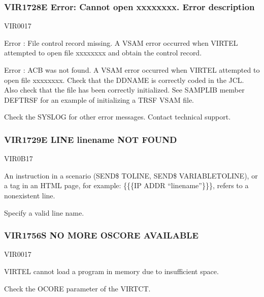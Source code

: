 \documentclass[letterpaper,10pt,english]{sphinxmanual}
\begin{document}
\subsubsection{VIR1728E Error: Cannot open xxxxxxxx. Error description}
\label{\detokenize{messages:vir1728e-error-cannot-open-xxxxxxxx-error-description}}\begin{description}
\sphinxAtStartPar
VIR0017

\sphinxAtStartPar
Error : File control record missing.
A VSAM error occurred when VIRTEL attempted to open file xxxxxxxx and obtain the control record.

\sphinxAtStartPar
Error : ACB was not found.
A VSAM error occurred when VIRTEL attempted to open file xxxxxxxx. Check that the DDNAME is correctly coded in the JCL. Also check that the file has been correctly initialized. See SAMPLIB
member DEFTRSF for an example of initializing a TRSF VSAM file.

\sphinxAtStartPar
Check the SYSLOG for other error messages. Contact technical support.

\end{description}


\subsubsection{VIR1729E LINE linename NOT FOUND}
\label{\detokenize{messages:vir1729e-line-linename-not-found}}\begin{description}
\sphinxAtStartPar
VIR0B17

\sphinxAtStartPar
An instruction in a scenario (SEND\$ TO\sphinxhyphen{}LINE, SEND\$ VARIABLE\sphinxhyphen{}TO\sphinxhyphen{}LINE), or a tag in an HTML page, for example: \{\{\{IP\sphinxhyphen{} ADDR “linename”\}\}\}, refers to a non\sphinxhyphen{}existent line.

\sphinxAtStartPar
Specify a valid line name.

\end{description}


\subsubsection{VIR1756S NO MORE OSCORE AVAILABLE}
\label{\detokenize{messages:vir1756s-no-more-oscore-available}}\begin{description}
\sphinxAtStartPar
VIR0017

\sphinxAtStartPar
VIRTEL cannot load a program in memory due to insufficient space.

\sphinxAtStartPar
Check the OCORE parameter of the VIRTCT.

\end{description}
\end{document}
